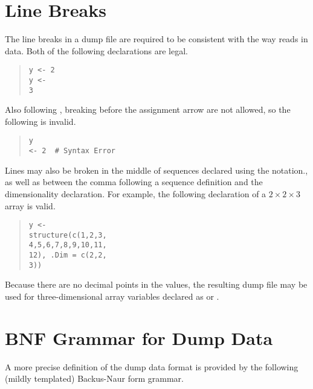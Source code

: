 \section{Line Breaks}

The line breaks in a dump file are required to be consistent with
the way \R reads in data.  Both of the following declarations are
legal.
%
\begin{quote}
\begin{Verbatim}[fontsize=\small]
y <- 2
y <-
3
\end{Verbatim}
\end{quote}
%
Also following \R, breaking before the assignment arrow are not
allowed, so the following is invalid.
%
\begin{quote}
\begin{Verbatim}[fontsize=\small]
y
<- 2  # Syntax Error
\end{Verbatim}
\end{quote}

Lines may also be broken in the middle of sequences declared
using the  notation., as well as between the comma
following a sequence definition and the dimensionality declaration.
For example, the following declaration of a $2 \times 2 \times 3$
array is valid.
%
\begin{quote}
\begin{Verbatim}[fontsize=\small]
y <-
structure(c(1,2,3,
4,5,6,7,8,9,10,11,
12), .Dim = c(2,2,
3))
\end{Verbatim}
\end{quote}
%
Because there are no decimal points in the values, the resulting dump
file may be used for three-dimensional array variables declared as
 or .

\section{BNF Grammar for Dump Data}

A more precise definition of the dump data format is provided
by the following (mildly templated) Backus-Naur form grammar.

